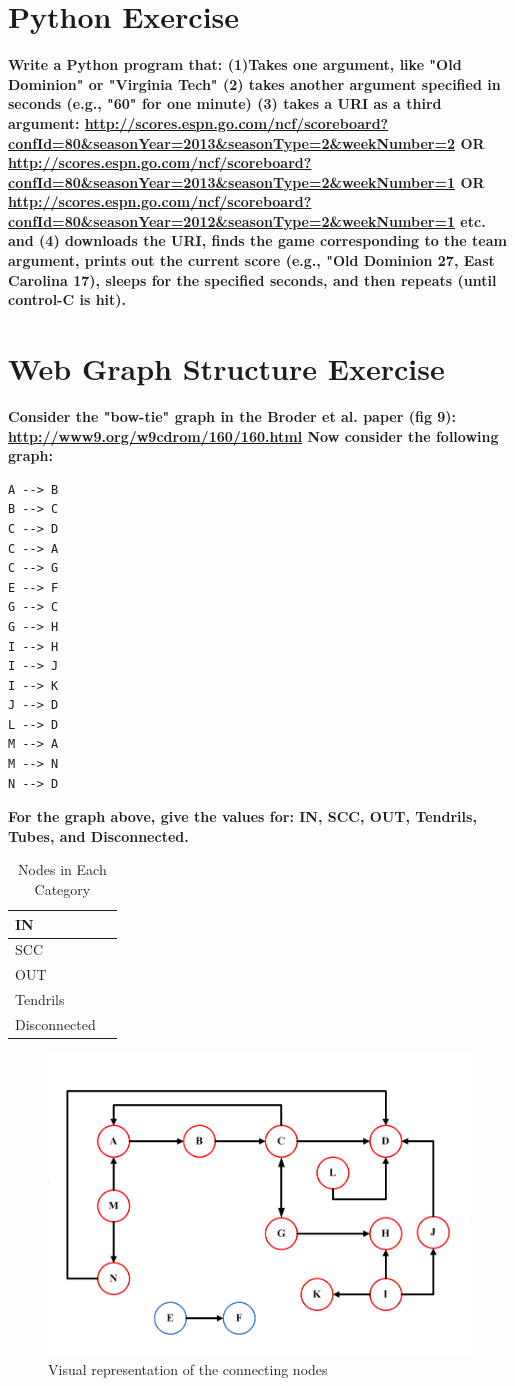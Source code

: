 \documentclass{article}
\begin{document}
\section{Python Exercise}
\textbf{Write a Python program that:
(1)Takes one argument, like "Old Dominion" or "Virginia Tech" (2) takes another argument specified in seconds (e.g., "60" for one minute) (3) takes a URI as a third argument: \url{http://scores.espn.go.com/ncf/scoreboard?confId=80&seasonYear=2013&seasonType=2&weekNumber=2} \textbf{OR} \url{http://scores.espn.go.com/ncf/scoreboard?confId=80&seasonYear=2013&seasonType=2&weekNumber=1} \textbf{OR} \url{http://scores.espn.go.com/ncf/scoreboard?confId=80&seasonYear=2012&seasonType=2&weekNumber=1} etc. and (4) downloads the URI, finds the game corresponding to the team argument, prints out the current score (e.g., "Old Dominion 27, East Carolina 17), sleeps for the specified seconds, and then repeats (until control-C is hit).}

\newpage

\section{Web Graph Structure Exercise}
\textbf{Consider the "bow-tie" graph in the Broder et al. paper (fig 9): \url{http://www9.org/w9cdrom/160/160.html}
Now consider the following graph:}

\begin{verbatim}
A --> B
B --> C
C --> D
C --> A
C --> G
E --> F
G --> C
G --> H
I --> H
I --> J
I --> K
J --> D 
L --> D
M --> A
M --> N
N --> D
\end{verbatim}

\textbf{For the graph above, give the values for: IN, SCC, OUT, Tendrils, Tubes, and Disconnected.}

\newpage

\begin{table}
\centering
\caption{Nodes in Each Category}
\begin{tabular}{l | l}
\hline
IN & \\ \hline
SCC &  \\ \hline
OUT & \\ \hline
Tendrils & \\ \hline
Disconnected &  \\
\hline
\end{tabular}
\end{table}


\begin{figure}
\centering
\includegraphics[scale=0.50]{assn01Q03}
\caption{Visual representation of the connecting nodes}
\end{figure}
\end{document}
